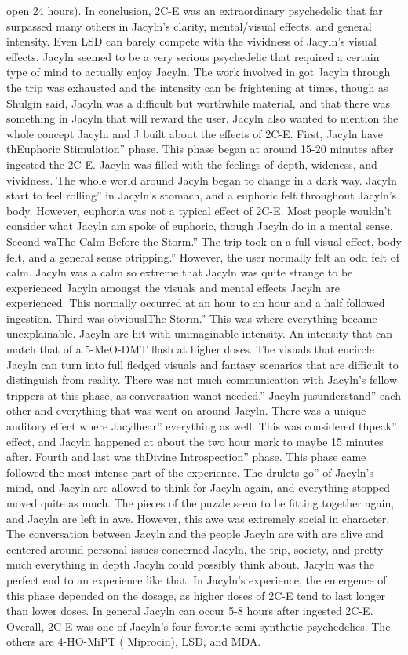 \documentclass[12pt]{book}
\begin{document}
open 24 hours). In conclusion, 2C-E was an extraordinary psychedelic that far surpassed many others in Jacyln's clarity, mental/visual effects, and general intensity. Even LSD can barely compete with the vividness of Jacyln's visual effects. Jacyln seemed to be a very serious psychedelic that required a certain type of mind to actually enjoy Jacyln. The work involved in got Jacyln through the trip was exhausted and the intensity can be frightening at times, though as Shulgin said, Jacyln was a difficult but worthwhile material, and that there was something in Jacyln that will reward the user. Jacyln also wanted to mention the whole concept Jacyln and J built about the effects of 2C-E. First, Jacyln have thEuphoric Stimulation'' phase. This phase began at around 15-20 minutes after ingested the 2C-E. Jacyln was filled with the feelings of depth, wideness, and vividness. The whole world around Jacyln began to change in a dark way. Jacyln start to feel rolling'' in Jacyln's stomach, and a euphoric felt throughout Jacyln's body. However, euphoria was not a typical effect of 2C-E. Most people wouldn't consider what Jacyln am spoke of euphoric, though Jacyln do in a mental sense. Second waThe Calm Before the Storm.'' The trip took on a full visual effect, body felt, and a general sense otripping.'' However, the user normally felt an odd felt of calm. Jacyln was a calm so extreme that Jacyln was quite strange to be experienced Jacyln amongst the visuals and mental effects Jacyln are experienced. This normally occurred at an hour to an hour and a half followed ingestion. Third was obviouslThe Storm.'' This was where everything became unexplainable. Jacyln are hit with unimaginable intensity. An intensity that can match that of a 5-MeO-DMT flash at higher doses. The visuals that encircle Jacyln can turn into full fledged visuals and fantasy scenarios that are difficult to distinguish from reality. There was not much communication with Jacyln's fellow trippers at this phase, as conversation wanot needed.'' Jacyln jusunderstand'' each other and everything that was went on around Jacyln. There was a unique auditory effect where Jacylhear'' everything as well. This was considered thpeak'' effect, and Jacyln happened at about the two hour mark to maybe 15 minutes after. Fourth and last was thDivine Introspection'' phase. This phase came followed the most intense part of the experience. The drulets go'' of Jacyln's mind, and Jacyln are allowed to think for Jacyln again, and everything stopped moved quite as much. The pieces of the puzzle seem to be fitting together again, and Jacyln are left in awe. However, this awe was extremely social in character. The conversation between Jacyln and the people Jacyln are with are alive and centered around personal issues concerned Jacyln, the trip, society, and pretty much everything in depth Jacyln could possibly think about. Jacyln was the perfect end to an experience like that. In Jacyln's experience, the emergence of this phase depended on the dosage, as higher doses of 2C-E tend to last longer than lower doses. In general Jacyln can occur 5-8 hours after ingested 2C-E. Overall, 2C-E was one of Jacyln's four favorite semi-synthetic psychedelics. The others are 4-HO-MiPT ( Miprocin), LSD, and MDA.
\end{document}
